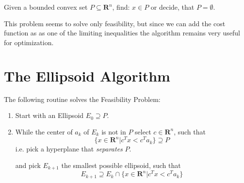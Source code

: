 \documentclass[10pt]{article}
\newcommand{\R}{\mathbf{R}}
\newcommand{\transpose}{T}
\begin{document}
Given a bounded convex set $P\subseteq \R^n$, find: $x \in P$ or decide, that $P = \emptyset$.

This problem seems to solve only feasibility, but since we can add the cost function as as one of the limiting inequalities the algorithm remains very useful for optimization.

\section{The Ellipsoid Algorithm}
The following routine solves the Feasibility Problem:
\begin{enumerate}
\item Start with an Ellipsoid $E_0 \supseteq P$. 
\item While the center of $a_k$ of $E_k$ is not in $P$ select $c \in \R^n$, such that
\[
\{x \in \R^n | c^\transpose x < c^\transpose a_k \} \supseteq P
\]
i.e. pick a hyperplane that \emph{separates} $P$.

and pick $E_{k+1}$ the smallest possible ellipsoid, such that
\[
E_{k+1} \supseteq E_k \cap \{x \in \R^n | c^\transpose x < c^\transpose a_k \}
\]
\end{enumerate}
\end{document}
